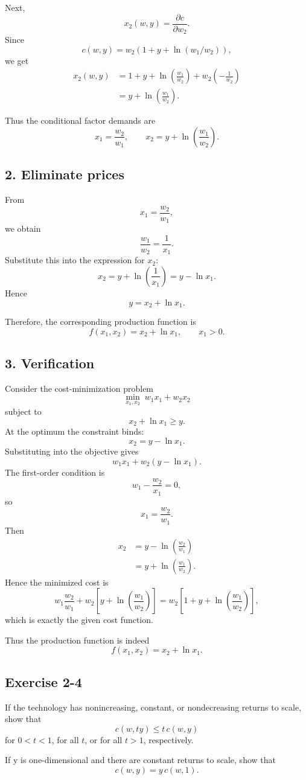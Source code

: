 Next,
\[
x_2(w,y)=\frac{\partial c}{\partial w_2}.
\]
Since
\[
c(w,y)=w_2(1+y+\ln(w_1/w_2)),
\]
we get
\[
\begin{aligned}
x_2(w,y)
&=
1+y+\ln\left(\frac{w_1}{w_2}\right)
+
w_2\left(-\frac{1}{w_2}\right)\\
&=
y+\ln\left(\frac{w_1}{w_2}\right).
\end{aligned}
\]

Thus the conditional factor demands are
\[
x_1=\frac{w_2}{w_1},
\qquad
x_2=y+\ln\left(\frac{w_1}{w_2}\right).
\]

\subsection*{2. Eliminate prices}

From
\[
x_1=\frac{w_2}{w_1},
\]
we obtain
\[
\frac{w_1}{w_2}=\frac{1}{x_1}.
\]
Substitute this into the expression for \(x_2\):
\[
x_2
=
y+\ln\left(\frac{1}{x_1}\right)
=
y-\ln x_1.
\]
Hence
\[
y=x_2+\ln x_1.
\]

Therefore, the corresponding production function is
\[
\boxed{
f(x_1,x_2)=x_2+\ln x_1,
\qquad x_1>0.
}
\]

\subsection*{3. Verification}

Consider the cost-minimization problem
\[
\min_{x_1,x_2}\; w_1x_1+w_2x_2
\]
subject to
\[
x_2+\ln x_1\ge y.
\]
At the optimum the constraint binds:
\[
x_2=y-\ln x_1.
\]
Substituting into the objective gives
\[
w_1x_1+w_2(y-\ln x_1).
\]
The first-order condition is
\[
w_1-\frac{w_2}{x_1}=0,
\]
so
\[
x_1=\frac{w_2}{w_1}.
\]
Then
\[
\begin{aligned}
x_2
&=y-\ln\left(\frac{w_2}{w_1}\right)\\
&=
y+\ln\left(\frac{w_1}{w_2}\right).
\end{aligned}
\]
Hence the minimized cost is
\[
w_1\frac{w_2}{w_1}
+
w_2\left[y+\ln\left(\frac{w_1}{w_2}\right)\right]
=
w_2\left[1+y+\ln\left(\frac{w_1}{w_2}\right)\right],
\]
which is exactly the given cost function.

Thus the production function is indeed
\[
\boxed{
f(x_1,x_2)=x_2+\ln x_1.
}
\]


\vspace{30pt}
\begin{tcolorbox}[breakable]

\subsection*{Exercise 2-4}

If the technology has nonincreasing, constant, or nondecreasing returns to scale,
show that
\[
c(w,ty) \le t\,c(w,y)
\]
for $0<t<1$, for all $t$, or for all $t>1$, respectively.

If y is one-dimensional and there are constant returns to scale, show that
\[
c(w,y)=y\,c(w,1).
\]

\end{tcolorbox}


